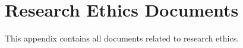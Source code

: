 %
%
%                 

\chapter{Research Ethics Documents}
\label{sec:appendixa}


This appendix contains all documents related to research ethics.




